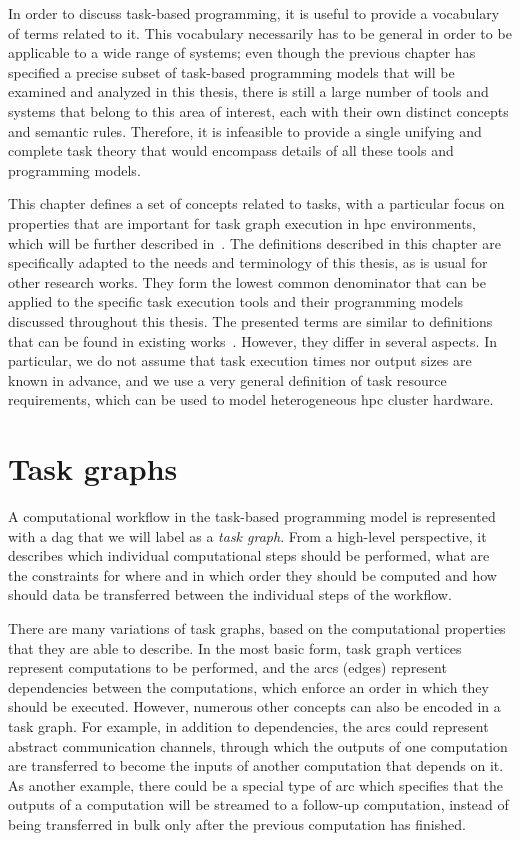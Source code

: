 In order to discuss task-based programming, it is useful to provide a vocabulary of terms related
to it. This vocabulary necessarily has to be general in order to be applicable to a wide range of
systems; even though the previous chapter has specified a precise subset of task-based programming
models that will be examined and analyzed in this thesis, there is still a large number of tools
and systems that belong to this area of interest, each with their own distinct concepts and
semantic rules. Therefore, it is infeasible to provide a single unifying and complete task theory
that would encompass details of all these tools and programming models.

This chapter defines a set of concepts related to tasks, with a particular focus on properties that
are important for task graph execution in \gls{hpc} environments, which will be
further described in~. The definitions described in this chapter are
specifically adapted to the needs and terminology of this thesis, as is usual for other research
works. They form the lowest common denominator that can be applied to the specific task execution
tools and their programming models discussed throughout this thesis. The presented terms are
similar to definitions that can be found in existing works~\cite{task_scheduling,hagras2003static,wang2018list}. However, they
differ in several aspects. In particular, we do not assume that task execution times nor output
sizes are known in advance, and we use a very general definition of task resource requirements,
which can be used to model heterogeneous \gls{hpc} cluster hardware.

\section{Task graphs}
A computational workflow in the task-based programming model is represented with a
\gls{dag} that we will label as a \emph{task graph}. From a high-level
perspective, it describes which individual computational steps should be performed, what are the
constraints for where and in which order they should be computed and how should data be transferred
between the individual steps of the workflow.

There are many variations of task graphs, based on the computational properties that they are able
to describe. In the most basic form, task graph vertices represent computations to be performed,
and the arcs (edges) represent dependencies between the computations, which enforce an order in
which they should be executed. However, numerous other concepts can also be encoded in a task
graph. For example, in addition to dependencies, the arcs could represent abstract communication
channels, through which the outputs of one computation are transferred to become the inputs of
another computation that depends on it. As another example, there could be a special type of arc
which specifies that the outputs of a computation will be streamed to a follow-up computation,
instead of being transferred in bulk only after the previous computation has finished.

